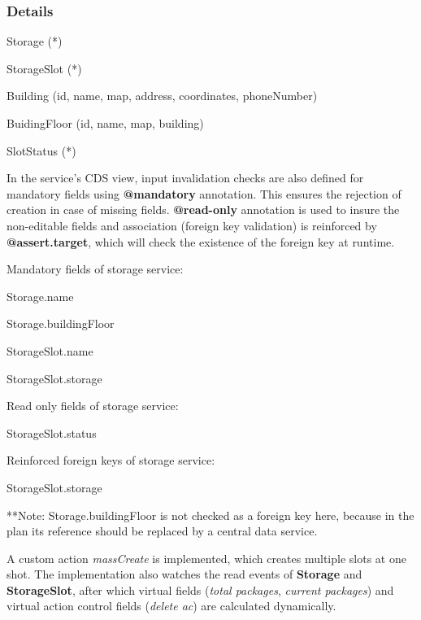 \subsubsection{Details}

\begin{compactenum}
	\item Storage (*)
    \item StorageSlot (*)
    \item Building (id, name, map, address, coordinates, phoneNumber)
    \item BuidingFloor (id, name, map, building)
    \item SlotStatus (*)
\end{compactenum}

\bigskip
In the service's CDS view, input invalidation checks are also defined for mandatory fields using \textbf{@mandatory} annotation. This ensures the rejection of creation in case of missing fields. \textbf{@read-only} annotation is used to insure the non-editable fields and association (foreign key validation) is reinforced by \textbf{@assert.target}, which will check the existence of the foreign key at runtime.

\bigskip
Mandatory fields of storage service:
\begin{compactenum}
	\item Storage.name
    \item Storage.buildingFloor
    \item StorageSlot.name
    \item StorageSlot.storage
\end{compactenum}

\bigskip
Read only fields of storage service:
\begin{compactenum}
	\item StorageSlot.status
\end{compactenum}

\bigskip
Reinforced foreign keys of storage service:
\begin{compactenum}
	\item StorageSlot.storage
\end{compactenum}

\bigskip
**Note: Storage.buildingFloor is not checked as a foreign key here, because in the plan its reference should be replaced by a central data service.


A custom action \textit{massCreate} is implemented, which creates multiple slots at one shot. The implementation also watches the read events of \textbf{Storage} and \textbf{StorageSlot}, after which virtual fields (\textit{total packages}, \textit{current packages}) and virtual action control fields (\textit{delete ac}) are calculated dynamically.

